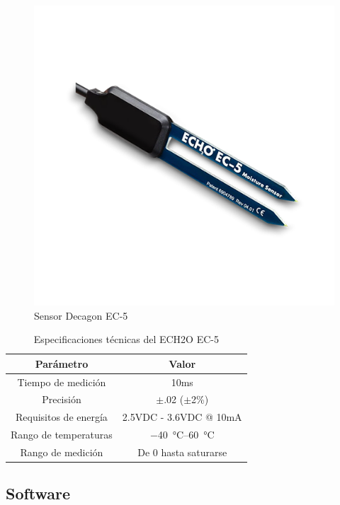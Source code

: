 \documentclass[../main]{subfiles}
\begin{document}
\begin{figure}[H]
	\centering
	\includegraphics[scale = 0.6]{res/sonde-ec-5-decagon_.png}
	\caption{Sensor Decagon EC-5\cite{ec5image}}
	\label{fig:ec5fig}
\end{figure}

\begin{table}[H]
	\centering
	\begin{tabular}{c c}
		\toprule
		Parámetro             & Valor                              \\
		\midrule
		Tiempo de medición    & 10ms                               \\
		Precisión             & $\pm$.02 ($\pm$2\%)                \\
		Requisitos de energía & 2.5VDC - 3.6VDC @ 10mA             \\
		Rango de temperaturas & \qtyrange{-40}{60}{\degreeCelsius} \\
		Rango de medición     & De 0 hasta saturarse               \\
		\bottomrule
	\end{tabular}
	\caption{Especificaciones técnicas del ECH2O EC-5\cite{ec5humedadsuelosensor}}
	\label{tab:ec5tecesp}
\end{table}

\subsection{Software}
\end{document}
